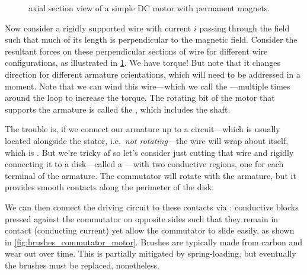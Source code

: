 \documentclass[dynamic_systems.tex]{subfiles}
\begin{document}
\begin{figure}
{
} %
\caption{axial section view of a simple DC motor with permanent magnets.}
\label{fig:dc_motor_02}
\end{figure}
  
Now consider a rigidly supported wire with current $i$ passing through the field such that much of its length is perpendicular to the magnetic field.
Consider the resultant forces on these perpendicular sections of wire for different wire configurations, as illustrated in \cref{fig:dc_motor_02}.
We have torque!
But note that it changes direction for different armature orientations, which will need to be addressed in a moment.
Note that we can wind this wire---which we call the ---multiple times around the loop to increase the torque.
The rotating bit of the motor that supports the armature is called the , which includes the shaft.

The trouble is, if we connect our armature up to a circuit---which is usually located alongside the stator, i.e.\ \emph{not rotating}---the wire will wrap about itself, which is .
But we're tricky af so let's consider just cutting that wire and rigidly connecting it to a disk---called a ---with two conductive regions, one for each terminal of the armature.
The commutator will rotate with the armature, but it provides smooth contacts along the perimeter of the disk.
\tags{}

We can then connect the driving circuit to these contacts via : conductive blocks pressed against the commutator on opposite sides such that they remain in contact (conducting current) yet allow the commutator to slide easily, as shown in \cref{fig:brushes_commutator_motor}.
Brushes are typically made from carbon and wear out over time.
This is partially mitigated by spring-loading, but eventually the brushes must be replaced, nonetheless.
\tags{}
\end{document}
